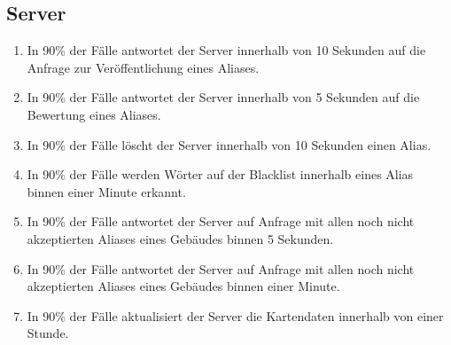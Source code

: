 \subsection{Server}

\begin{enumerate}
    \item In 90\% der Fälle antwortet der Server innerhalb von 10 Sekunden auf die Anfrage zur Veröffentlichung eines Aliases.
    \item In 90\% der Fälle antwortet der Server innerhalb von 5 Sekunden auf die Bewertung eines Aliases.
    \item In 90\% der Fälle löscht der Server innerhalb von 10 Sekunden einen Alias.
    \item In 90\% der Fälle werden Wörter auf der Blacklist innerhalb eines Alias binnen einer Minute erkannt.
    \item In 90\% der Fälle antwortet der Server auf Anfrage mit allen noch nicht akzeptierten Aliases eines Gebäudes binnen 5 Sekunden.
    \item In 90\% der Fälle antwortet der Server auf Anfrage mit allen noch nicht akzeptierten Aliases eines Gebäudes binnen einer Minute.
    \item In 90\% der Fälle aktualisiert der Server die Kartendaten innerhalb von einer Stunde.
\end{enumerate}